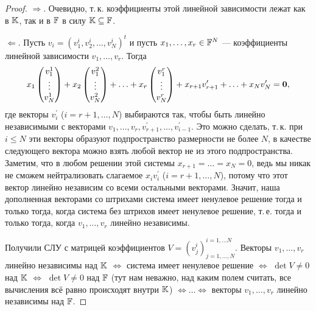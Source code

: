 \begin{proof}
    $\Rightarrow$. Очевидно, т.\,к. коэффициенты этой линейной зависимости лежат как в $\mathbb{K}$, так и в $\mathbb{F}$ в силу $\mathbb{K} \subseteq \mathbb{F}$.

    $\Leftarrow$. Пусть $v_i = (v^i_1, v^i_2, \ldots, v^i_N)^t$ и пусть $x_1, \ldots, x_r \in \mathbb{F}^N$ --- коэффициенты линейной зависимости $v_1, \ldots, v_r$. Тогда
    \[
        x_1
        \begin{pmatrix}
            v^1_1\\
            \vdots\\
            v^1_N
        \end{pmatrix} +
        x_2
        \begin{pmatrix}
            v^2_1\\
            \vdots\\
            v^2_N
        \end{pmatrix} + \ldots +
        x_r
        \begin{pmatrix}
            v^r_1\\
            \vdots\\
            v^r_N
        \end{pmatrix} + x_{r + 1}v^\prime_{r + 1} + \ldots + x_Nv^\prime_N = \boldsymbol{0},
    \]
    где векторы $v^\prime_i$ ($i = r + 1, \ldots, N$) выбираются так, чтобы быть линейно независимыми с векторами $v_1, \ldots, v_r, v^\prime_{r + 1}, \ldots, v^\prime_{i - 1}$. Это можно сделать, т.\,к. при $i \leqslant N$ эти векторы образуют подпространство размерности не более $N$, в качестве следующего вектора можно взять любой вектор не из этого подпространства. Заметим, что в любом решении этой системы $x_{r + 1} = \ldots = x_N = 0$, ведь мы никак не сможем нейтрализовать слагаемое $x_iv^\prime_i$ ($i = r + 1, \ldots, N$), потому что этот вектор линейно независим со всеми остальными векторами. Значит, наша дополненная векторами со штрихами система имеет ненулевое решение тогда и только тогда, когда система без штрихов имеет ненулевое решение, т.\,е. тогда и только тогда, когда $v_1, \ldots, v_r$ линейно независимы.

    Получили СЛУ с матрицей коэффициентов $V = (v^i_j)^{i = 1, \ldots N}_{j = 1, \ldots, N}$. Векторы $v_1, \ldots, v_r$ линейно независимы над $\mathbb{K}$ $\Leftrightarrow$ система имеет ненулевое решение $\Leftrightarrow$ $\det V \ne 0$ над $\mathbb{K}$ $\Leftrightarrow$ $\det V \ne 0$ над $\mathbb{F}$ (тут нам неважно, над каким полем считать, все вычисления всё равно происходят внутри $\mathbb{K}$) $\Leftrightarrow\ldots\Leftrightarrow$ векторы $v_1, \ldots, v_r$ линейно независимы над $\mathbb{F}$.
\end{proof}

